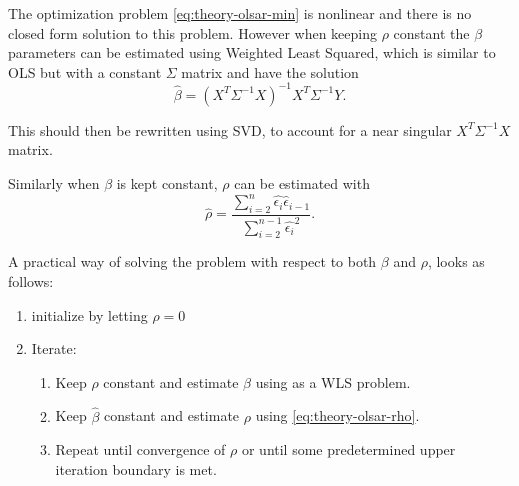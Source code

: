 The optimization problem \eqref{eq:theory-olsar-min} is nonlinear and there is no closed form solution to this problem. However when keeping $\rho$ constant the $\beta$ parameters can be estimated using Weighted Least Squared, which is similar to OLS but with a constant $\Sigma$ matrix and have the solution \cite[p.~38]{time-series-analysis}
\begin{equation}
\hat{\beta} = (X^T \Sigma^{-1} X)^{-1} X^T \Sigma^{-1} Y.
\end{equation}

This should then be rewritten using SVD, to account for a near singular $X^T \Sigma^{-1} X$ matrix.

Similarly when $\beta$ is kept constant, $\rho$ can be estimated with  \cite[p.~178]{autocorrelation-kousgaard}
\begin{equation}
\hat{\rho} = \frac{ \sum_{i=2}^n \hat{\epsilon_i}\hat{\epsilon}_{i-1} }{ \sum_{i=2}^{n-1} \hat{\epsilon_i}^2 }.
\label{eq:theory-olsar-rho}
\end{equation}

A practical way of solving the problem with respect to both $\beta$ and $\rho$, looks as follows:
\begin{enumerate}
\item initialize by letting $\rho=0$
\item Iterate: \begin{enumerate}
	\item Keep $\hat{\rho}$ constant and estimate $\beta$ using as a WLS problem.
	
	\item Keep $\hat{\beta}$ constant and estimate $\rho$ using \eqref{eq:theory-olsar-rho}.
	
	\item Repeat until convergence of $\rho$ or until some predetermined upper iteration boundary is met.
\end{enumerate}
\end{enumerate}
